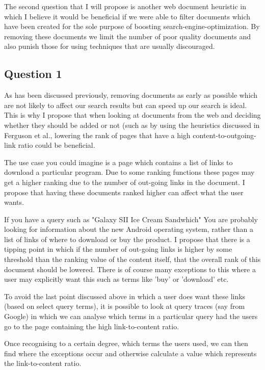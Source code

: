 \documentclass{acm_proc_article-sp}
\begin{document}
The second question that I will propose is another web document heuristic in which I believe it would be beneficial if we were able to filter documents which have been created for the sole purpose of boosting search-engine-optimization. By removing these documents we limit the number of poor quality documents and also punish those for using techniques that are usually discouraged. 

\subsection{Question 1}

As has been discussed previously, removing documents as early as possible which are not likely to affect our search results but can speed up our search is ideal. This is why I propose that when looking at documents from the web and deciding whether they should be added or not (such as by using the heuristics discussed in Ferguson et al., lowering the rank of pages that have a high content-to-outgoing-link ratio could be beneficial.

The use case you could imagine is a page which contains a list of links to download a particular program. Due to some ranking functions these pages may get a higher ranking due to the number of out-going links in the document. I propose that having these documents ranked higher can affect what the user wants.

If you have a query such as "Galaxy SII Ice Cream Sandwhich" You are probably looking for information about the new Android operating system, rather than a list of links of where to download or buy the product. I propose that there is a tipping point in which if the number of out-going links is higher by some threshold than the ranking value of the content itself, that the overall rank of this document should be lowered. There is of course many exceptions to this where a user may explicitly want this such as terms like 'buy' or 'download' etc.

To avoid the last point discussed above in which a user does want these links (based on select query terms), it is possible to look at query traces (say from Google) in which we can analyse which terms in a particular query had the users go to the page containing the high link-to-content ratio.

Once recognising to a certain degree, which terms the users used, we can then find where the exceptions occur and otherwise calculate a value which represents the link-to-content ratio.
\end{document}
